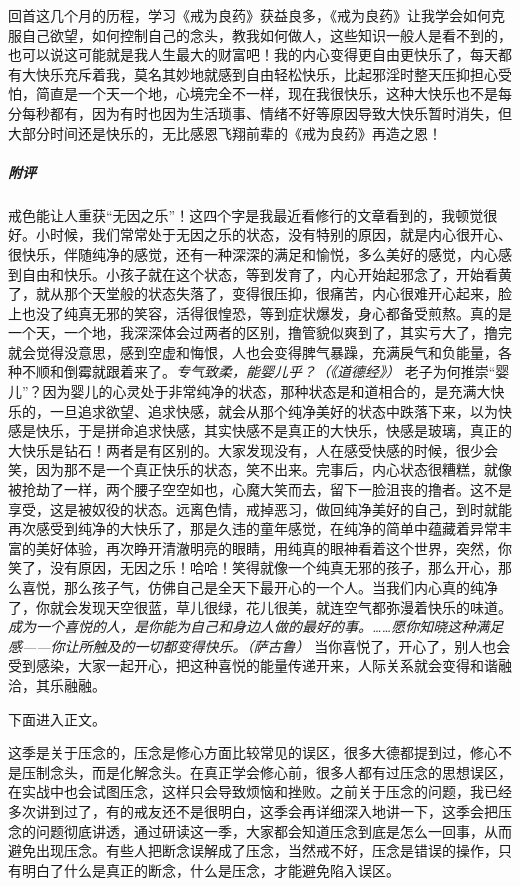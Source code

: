 \begin{case}
    回首这几个月的历程，学习《戒为良药》获益良多，《戒为良药》让我学会如何克服自己欲望，如何控制自己的念头，教我如何做人，这些知识一般人是看不到的，也可以说这可能就是我人生最大的财富吧！我的内心变得更自由更快乐了，每天都有大快乐充斥着我，莫名其妙地就感到自由轻松快乐，比起邪淫时整天压抑担心受怕，简直是一个天一个地，心境完全不一样，现在我很快乐，这种大快乐也不是每分每秒都有，因为有时也因为生活琐事、情绪不好等原因导致大快乐暂时消失，但大部分时间还是快乐的，无比感恩飞翔前辈的《戒为良药》再造之恩！
    \subparagraph{附评} 戒色能让人重获“无因之乐”！这四个字是我最近看修行的文章看到的，我顿觉很好。小时候，我们常常处于无因之乐的状态，没有特别的原因，就是内心很开心、很快乐，伴随纯净的感觉，还有一种深深的满足和愉悦，多么美好的感觉，内心感到自由和快乐。小孩子就在这个状态，等到发育了，内心开始起邪念了，开始看黄了，就从那个天堂般的状态失落了，变得很压抑，很痛苦，内心很难开心起来，脸上也没了纯真无邪的笑容，活得很惶恐，等到症状爆发，身心都备受煎熬。真的是一个天，一个地，我深深体会过两者的区别，撸管貌似爽到了，其实亏大了，撸完就会觉得没意思，感到空虚和悔恨，人也会变得脾气暴躁，充满戾气和负能量，各种不顺和倒霉就跟着来了。\textit{专气致柔，能婴儿乎？（《道德经》）} 老子为何推崇“婴儿”？因为婴儿的心灵处于非常纯净的状态，那种状态是和道相合的，是充满大快乐的，一旦追求欲望、追求快感，就会从那个纯净美好的状态中跌落下来，以为快感是快乐，于是拼命追求快感，其实快感不是真正的大快乐，快感是玻璃，真正的大快乐是钻石！两者是有区别的。大家发现没有，人在感受快感的时候，很少会笑，因为那不是一个真正快乐的状态，笑不出来。完事后，内心状态很糟糕，就像被抢劫了一样，两个腰子空空如也，心魔大笑而去，留下一脸沮丧的撸者。这不是享受，这是被奴役的状态。远离色情，戒掉恶习，做回纯净美好的自己，到时就能再次感受到纯净的大快乐了，那是久违的童年感觉，在纯净的简单中蕴藏着异常丰富的美好体验，再次睁开清澈明亮的眼睛，用纯真的眼神看着这个世界，突然，你笑了，没有原因，无因之乐！哈哈！笑得就像一个纯真无邪的孩子，那么开心，那么喜悦，那么孩子气，仿佛自己是全天下最开心的一个人。当我们内心真的纯净了，你就会发现天空很蓝，草儿很绿，花儿很美，就连空气都弥漫着快乐的味道。\textit{成为一个喜悦的人，是你能为自己和身边人做的最好的事。……愿你知晓这种满足感——你让所触及的一切都变得快乐。（萨古鲁）} 当你喜悦了，开心了，别人也会受到感染，大家一起开心，把这种喜悦的能量传递开来，人际关系就会变得和谐融洽，其乐融融。
\end{case}

下面进入正文。

这季是关于压念的，压念是修心方面比较常见的误区，很多大德都提到过，修心不是压制念头，而是化解念头。在真正学会修心前，很多人都有过压念的思想误区，在实战中也会试图压念，这样只会导致烦恼和挫败。之前关于压念的问题，我已经多次讲到过了，有的戒友还不是很明白，这季会再详细深入地讲一下，这季会把压念的问题彻底讲透，通过研读这一季，大家都会知道压念到底是怎么一回事，从而避免出现压念。有些人把断念误解成了压念，当然戒不好，压念是错误的操作，只有明白了什么是真正的断念，什么是压念，才能避免陷入误区。

